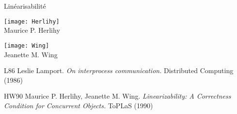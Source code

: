 
\begingroup

\begin{frame}{Linéarisabilité}
  \vFill
  \hFill
  \begin{minipage}{.6\textwidth}
    \begin{center}
      \texttt{[image: Herlihy]}\\
      Maurice P. Herlihy
    \end{center}
  \end{minipage}
  \hFill
  \begin{minipage}{.28\textwidth}
    \begin{center}
      \texttt{[image: Wing]}\\
      Jeanette M. Wing
    \end{center}
  \end{minipage}
  \hFill

  \vFill
  \begin{citing}
  \item[L86] Leslie Lamport. \textit{On interprocess communication.} Distributed Computing (1986)
  \item[HW90] Maurice P. Herlihy, Jeanette M. Wing. \textit{Linearizability: A Correctness Condition for Concurrent Objects.} ToPLaS (1990)
  \end{citing}
\end{frame}

\endgroup
\endinput
